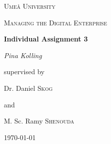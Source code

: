 \documentclass[a4]{scrartcl}
\begin{document}
	
	\begin{titlepage}
		\centering
		{\scshape\LARGE Umeå University \par}
		\vspace{1cm}
		{\scshape\Large Managing the Digital Enterprise \par }
		\vspace{1.5cm}
		{\huge\bfseries   {\color{BurntOrange}Individual Assignment 3} \par}
		\vspace{2cm}
		{\Large\itshape Pina Kolling\par}
		\vfill
		supervised by \par 
		\vspace{1cm}
		Dr. Daniel \textsc{Skog} \par 
		and \par 
		M. Sc. Ramy \textsc{Shenouda} 
		
		\vfill
		
		{\large \today\par}
	\end{titlepage}
	
	\setcounter{page}{1}
	
	\begin{doublespace}
		\tableofcontents
	\end{doublespace}

	
	\newpage



\end{document}
